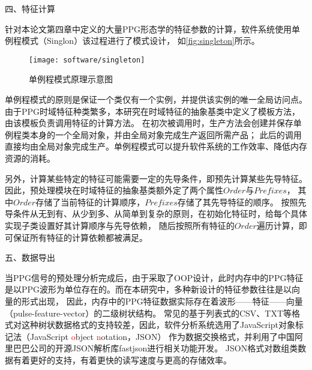 四、特征计算

针对本论文第四章中定义的大量PPG形态学的特征参数的计算，软件系统使用单例程模式（Singlon）该过程进行了模式设计\cite{Enrich2018}，
如\autoref{fig:singleton}所示。

\begin{figure}[htbp]
    \centering
    \texttt{[image: software/singleton]}
    \caption{\label{fig:singleton}单例程模式原理示意图}
\end{figure}

单例程模式的原则是保证一个类仅有一个实例，并提供该实例的唯一全局访问点。
由于PPG时域特征种类繁多，本研究在时域特征的抽象基类中定义了模板方法，
由该模板负责调用特征的计算方法。
在初次被调用时，生产方法会创建并保存单例程类本身的一个全局对象，并由全局对象完成生产返回所需产品；
此后的调用直接均由全局对象完成生产。单例程模式可以提升软件系统的工作效率、降低内存资源的消耗。

另外，计算某些特定的特征可能需要一定的先导条件，即预先计算某些先导特征。因此，预处理模块在时域特征的抽象基类额外定了两个属性$Order$与$Prefixes$，
其中$Order$存储了当前特征的计算顺序，$Prefixes$存储了其先导特征的顺序。
按照先导条件从无到有、从少到多、从简单到复杂的原则，在初始化特征时，给每个具体实现子类设置好其计算顺序与先导依赖，
随后按照所有特征的$Order$遍历计算，即可保证所有特征的计算依赖都被满足。

五、数据导出

当PPG信号的预处理分析完成后，由于采取了OOP设计，此时内存中的PPG特征是以PPG波形为单位存在的。而在本研究中，多种新设计的特征参数往往是以向量的形式出现，
因此，内存中的PPG特征数据实际存在着波形——特征——向量（pulse-feature-vector）的二级树状结构。
常见的基于列表式的CSV、TXT等格式对这种树状数据格式的支持较差，因此，软件分析系统选用了JavaScript对象标记法（JavaScript \textcolor{red}{o}bject \textcolor{red}{n}otation，JSON）\cite{json}
作为数据交换格式，并利用了中国阿里巴巴公司的开源JSON解析库fastjson\cite{fastjson}进行相关功能开发。
JSON格式对数组类数据有着更好的支持，有着更快的读写速度与更高的存储效率。


